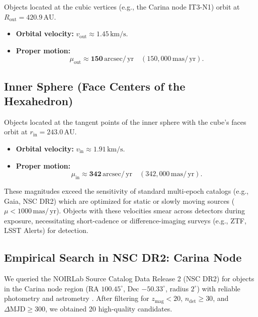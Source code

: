 \documentclass[11pt,a4paper]{article}
\theoremstyle{remark}
\newcommand{\AU}{\,\mathrm{AU}}
\newcommand{\mas}{\,\mathrm{mas}}
\newcommand{\yr}{\,\mathrm{yr}}
\newcommand{\arcsec}{\,\mathrm{arcsec}}
\begin{document}
Objects located at the cubic vertices (e.g., the Carina node IT3-N1) orbit at $R_{\text{out}} = 420.9\AU$.
\begin{itemize}[leftmargin=2em]
    \item \textbf{Orbital velocity:} $v_{\text{out}} \approx 1.45\,\mathrm{km/s}$.
    \item \textbf{Proper motion:} 
    \begin{equation}
        \mu_{\text{out}} \approx \mathbf{150\arcsec/\yr} \quad (150{,}000\mas/\yr).
        \label{eq:mu_out}
    \end{equation}
\end{itemize}

\subsection{Inner Sphere (Face Centers of the Hexahedron)}

Objects located at the tangent points of the inner sphere with the cube's faces orbit at $r_{\text{in}} = 243.0\AU$.
\begin{itemize}[leftmargin=2em]
    \item \textbf{Orbital velocity:} $v_{\text{in}} \approx 1.91\,\mathrm{km/s}$.
    \item \textbf{Proper motion:} 
    \begin{equation}
        \mu_{\text{in}} \approx \mathbf{342\arcsec/\yr} \quad (342{,}000\mas/\yr).
        \label{eq:mu_in}
    \end{equation}
\end{itemize}

These magnitudes exceed the sensitivity of standard multi-epoch catalogs (e.g., Gaia, NSC DR2) which are optimized for static or slowly moving sources ($\mu < 1000\mas/\yr$). Objects with these velocities smear across detectors during exposure, necessitating short-cadence or difference-imaging surveys (e.g., ZTF, LSST Alerts) for detection.

\subsection{Empirical Search in NSC DR2: Carina Node}

We queried the NOIRLab Source Catalog Data Release 2 (NSC DR2) for objects in the Carina node region (RA $100.45^\circ$, Dec $-50.33^\circ$, radius $2^\circ$) with reliable photometry and astrometry \cite{nsc_dr2}. After filtering for $z_{\text{mag}} < 20$, $n_{\text{det}} \ge 30$, and $\Delta\text{MJD} \ge 300$, we obtained 20 high-quality candidates.
\end{document}
